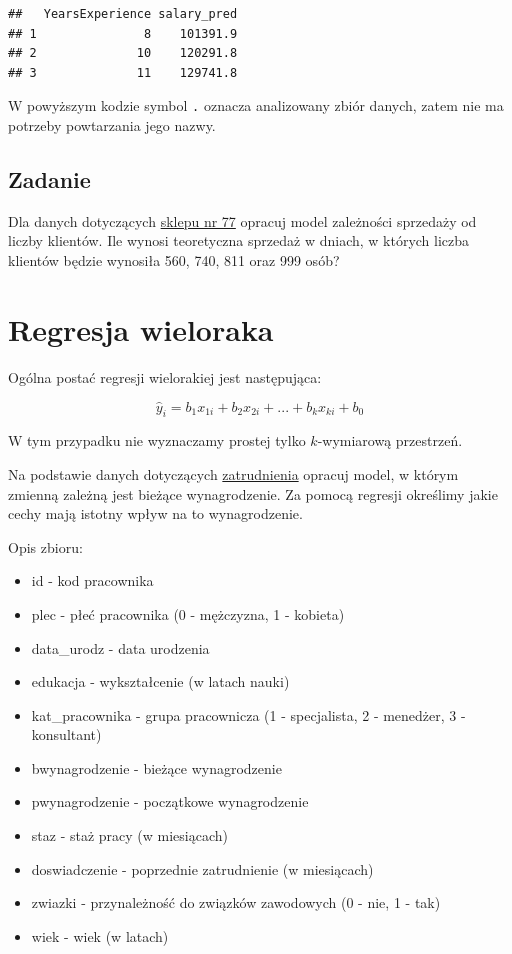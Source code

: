 \documentclass[]{book}
\providecommand{\tightlist}{%
  \setlength{\itemsep}{0pt}\setlength{\parskip}{0pt}}
\begin{document}
\begin{verbatim}
##   YearsExperience salary_pred
## 1               8    101391.9
## 2              10    120291.8
## 3              11    129741.8
\end{verbatim}

W powyższym kodzie symbol \texttt{.} oznacza analizowany zbiór danych, zatem nie ma potrzeby powtarzania jego nazwy.

\hypertarget{zadanie}{%
\subsection{Zadanie}\label{zadanie}}

Dla danych dotyczących \href{data/sklep77.xlsx}{sklepu nr 77} opracuj model zależności sprzedaży od liczby klientów. Ile wynosi teoretyczna sprzedaż w dniach, w których liczba klientów będzie wynosiła 560, 740, 811 oraz 999 osób?

\hypertarget{regresja-wieloraka}{%
\section{Regresja wieloraka}\label{regresja-wieloraka}}

Ogólna postać regresji wielorakiej jest następująca:

\[\hat{y}_{i}=b_{1}x_{1i}+b_{2}x_{2i}+...+b_{k}x_{ki}+b_{0}\]

W tym przypadku nie wyznaczamy prostej tylko \(k\)-wymiarową przestrzeń.

Na podstawie danych dotyczących \href{data/pracownicy.xlsx}{zatrudnienia} opracuj model, w którym zmienną zależną jest bieżące wynagrodzenie. Za pomocą regresji określimy jakie cechy mają istotny wpływ na to wynagrodzenie.

Opis zbioru:

\begin{itemize}
\tightlist
\item
  id - kod pracownika
\item
  plec - płeć pracownika (0 - mężczyzna, 1 - kobieta)
\item
  data\_urodz - data urodzenia
\item
  edukacja - wykształcenie (w latach nauki)
\item
  kat\_pracownika - grupa pracownicza (1 - specjalista, 2 - menedżer, 3 - konsultant)
\item
  bwynagrodzenie - bieżące wynagrodzenie
\item
  pwynagrodzenie - początkowe wynagrodzenie
\item
  staz - staż pracy (w miesiącach)
\item
  doswiadczenie - poprzednie zatrudnienie (w miesiącach)
\item
  zwiazki - przynależność do związków zawodowych (0 - nie, 1 - tak)
\item
  wiek - wiek (w latach)
\end{itemize}
\end{document}
